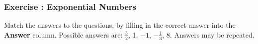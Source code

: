             \subsubsection{  Exercise : Exponential Numbers }
            \nopagebreak
        \label{m38359*id67549}Match the answers to the questions, by filling in the correct answer into the \textbf{Answer} column.
Possible answers are: $\frac{3}{2}$, 1, $-1$, $-\frac{1}{3}$, 8. Answers may be repeated.\par 
    \setlength\mytablespace{4\tabcolsep}
    \addtolength\mytablespace{3\arrayrulewidth}
    \setlength\mytablewidth{\linewidth}
    \setlength\mytableroom{\mytablewidth}
    \addtolength\mytableroom{-\mytablespace}
    \setlength\myfixedwidth{0pt}
    \setlength\mystarwidth{\mytableroom}
        \addtolength\mystarwidth{-\myfixedwidth}
        \divide{}
